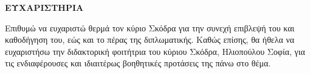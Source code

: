 \begin{center}
{\bf ΕΥΧΑΡΙΣΤΗΡΙΑ}
\end{center}

Επιθυμώ να ευχαριστώ θερμά τον κύριο Σκόδρα για την συνεχή επιβλεψή του και καθοδήγηση του, εώς και το πέρας της διπλωματικής. Καθώς επίσης, θα ήθελα να ευχαριστήσω την διδακτορική φοιτήτρια του κύριου Σκόδρα, Ηλιοπούλου Σοφία, για τις ενδιαφέρουσες και ιδιαιτέρως βοηθητικές προτάσεις της πάνω στο θέμα.

